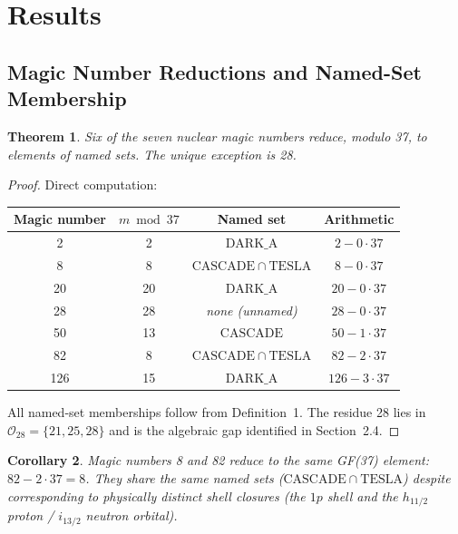\documentclass[11pt]{article}
\newtheorem{theorem}{Theorem}
\newtheorem{corollary}[theorem]{Corollary}
\theoremstyle{remark}
\begin{document}
\section{Results}
\label{sec:results}

\subsection{Magic Number Reductions and Named-Set Membership}

\begin{theorem}
Six of the seven nuclear magic numbers reduce, modulo 37, to elements of named sets.
The unique exception is 28.
\end{theorem}

\begin{proof}
Direct computation:
\begin{center}
\begin{tabular}{cccc}
\toprule
Magic number & $m\bmod 37$ & Named set & Arithmetic\\
\midrule
2   &  2 & $\mathrm{DARK\_A}$            & $2-0\cdot37$\\
8   &  8 & $\mathrm{CASCADE}\cap\mathrm{TESLA}$ & $8-0\cdot37$\\
20  & 20 & $\mathrm{DARK\_A}$            & $20-0\cdot37$\\
28  & 28 & \textit{none (unnamed)}       & $28-0\cdot37$\\
50  & 13 & $\mathrm{CASCADE}$            & $50-1\cdot37$\\
82  &  8 & $\mathrm{CASCADE}\cap\mathrm{TESLA}$ & $82-2\cdot37$\\
126 & 15 & $\mathrm{DARK\_A}$            & $126-3\cdot37$\\
\bottomrule
\end{tabular}
\end{center}
All named-set memberships follow from Definition~1. The residue 28 lies in
$\mathcal{O}_{28}=\{21,25,28\}$ and is the algebraic gap identified in Section~2.4.
\end{proof}

\begin{corollary}
Magic numbers 8 and 82 reduce to the same GF(37) element: $82-2\cdot37=8$.
They share the same named sets ($\mathrm{CASCADE}\cap\mathrm{TESLA}$) despite
corresponding to physically distinct shell closures (the $1p$ shell and the $h_{11/2}$
proton / $i_{13/2}$ neutron orbital).
\end{corollary}
\end{document}
